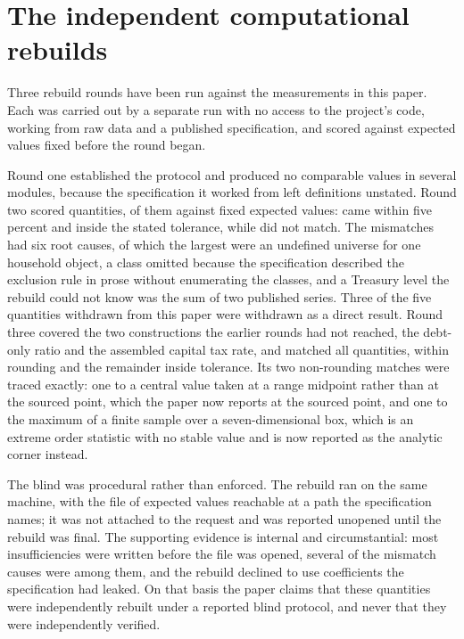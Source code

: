 \documentclass[11pt]{article}
\theoremstyle{definition}
\begin{document}
\appendix

\section{The independent computational rebuilds}
\label{app:rebuild}

Three rebuild rounds have been run against the measurements in this paper. Each was carried out by
a separate run with no access to the project's code, working from raw data and a published
specification, and scored against expected values fixed before the round began.

Round one established the protocol and produced no comparable values in several modules, because
the specification it worked from left definitions unstated. Round two scored
 quantities,  of them against fixed expected values:
 came within five percent and  inside the stated
tolerance, while  did not match. The mismatches had six root causes, of
which the largest were an undefined universe for one household object, a class omitted because the
specification described the exclusion rule in prose without enumerating the classes, and a
Treasury level the rebuild could not know was the sum of two published series. Three of the five
quantities withdrawn from this paper were withdrawn as a direct result. Round three covered the
two constructions the earlier rounds had not reached, the debt-only ratio and the assembled
capital tax rate, and matched all  quantities,
 within rounding and the remainder inside tolerance. Its two
non-rounding matches were traced exactly: one to a central value taken at a range midpoint rather
than at the sourced point, which the paper now reports at the sourced point, and one to the
maximum of a finite sample over a seven-dimensional box, which is an extreme order statistic with
no stable value and is now reported as the analytic corner instead.

The blind was procedural rather than enforced. The rebuild ran on the same machine, with the file
of expected values reachable at a path the specification names; it was not attached to the request
and was reported unopened until the rebuild was final. The supporting evidence is internal and
circumstantial: most insufficiencies were written before the file was opened, several of the
mismatch causes were among them, and the rebuild declined to use coefficients the specification
had leaked. On that basis the paper claims that these quantities were independently rebuilt under
a reported blind protocol, and never that they were independently verified.
\end{document}
